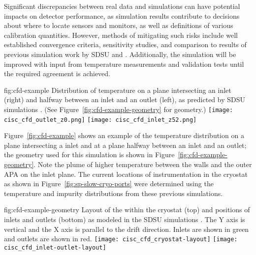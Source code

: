 
Significant discrepancies between real data and simulations can have potential impacts on detector performance, as simulation results contribute to decisions about where to locate sensors and monitors, as well as definitions of various calibration quantities. However, methods of mitigating such risks include well established convergence criteria, sensitivity studies, and comparison to results of previous  simulation work by SDSU and \fnal. Additionally, the simulation will be improved with input from temperature measurements and validation tests until the required agreement is achieved.

\begin{dunefigure}{fig:cfd-example}
  {Distribution of temperature on a plane intersecting an inlet (right) and halfway between an inlet and an outlet (left), as predicted by SDSU  simulations \cite{docdb-5915}. (See Figure\ \ref{fig:cfd-example-geometry} for geometry.)}
  \texttt{[image: cisc\_cfd\_outlet\_z0.png]}
  \texttt{[image: cisc\_cfd\_inlet\_z52.png]}
\end{dunefigure}

Figure\ \ref{fig:cfd-example} shows an example of the temperature
distribution on a plane intersecting a  inlet and at a
plane halfway between an inlet and an outlet; the geometry used for
this simulation is shown in Figure\ \ref{fig:cfd-example-geometry}.
Note the plume of higher temperature  between the walls and
the outer APA on the inlet plane.  The current locations of instrumentation in
the cryostat as shown in Figure\ \ref{fig:sp-slow-cryo-ports} were
determined using the temperature and impurity distributions from these
previous simulations.

\begin{dunefigure}{fig:cfd-example-geometry}
  {Layout of the  within the cryostat (top) and positions of
     inlets and outlets (bottom) as modeled in the SDSU
     simulations \cite{docdb-5915}.
    The Y axis is vertical and the X axis is parallel to the 
    drift direction.
    Inlets are shown in green and outlets are shown in red.}
  \texttt{[image: cisc\_cfd\_cryostat-layout]}
  \texttt{[image: cisc\_cfd\_inlet-outlet-layout]}
\end{dunefigure}

